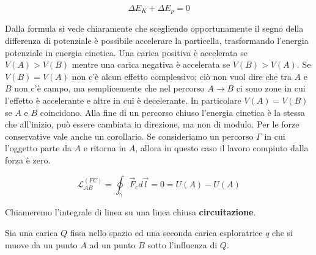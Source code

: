 \[
	\Delta E_K + \Delta E_p = 0
\]

Dalla formula si vede chiaramente che scegliendo opportunamente il segno della differenza di potenziale è possibile accelerare la particella, trasformando l'energia potenziale in energia cinetica. Una carica positiva è accelerata se $V(A)>V(B)$ mentre una carica negativa è accelerata se $V(B)>V(A)$. Se $V(B)=V(A)$ non c'è alcun effetto complessivo; ciò non vuol dire che tra $A$ e $B$ non c'è campo, ma semplicemente che nel percorso $A\to B$ ci sono zone in cui l'effetto è accelerante e altre in cui è decelerante. In particolare $V(A)=V(B)$ se $A$ e $B$ coincidono. Alla fine di un percorso chiuso l'energia cinetica è la stessa che all'inizio, può essere cambiata in direzione, ma non di modulo.
Per le forze conservative vale anche un corollario. Se consideriamo un percorso $\Gamma$ in cui l'oggetto parte da $A$ e ritorna in $A$, allora in questo caso il lavoro compiuto dalla forza è zero.

\[
	\mathcal{L}_{AB}^{(FC)} = \oint_{\gamma} \vec{F}_cd\vec{l} = 0 = U(A) - U(A)
\]

Chiameremo l'integrale di linea su una linea chiusa \textbf{circuitazione}.

Sia una carica $Q$ fissa nello spazio ed una seconda carica esploratrice $q$ che si muove da un punto $A$ ad un punto $B$ sotto l'influenza di $Q$.

